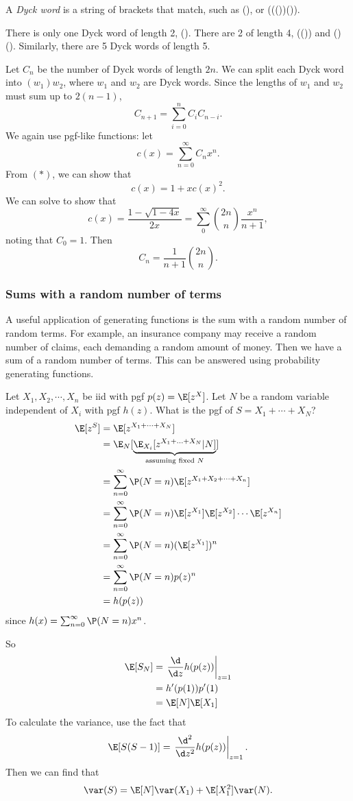 \documentclass[a4paper]{article}
\begin{document}
\begin{eg}
  A \emph{Dyck word} is a string of brackets that match, such as (), or  ((())()).

  There is only one Dyck word of length 2, (). There are 2 of length 4, (()) and ()(). Similarly, there are 5 Dyck words of length 5.

  Let $C_n$ be the number of Dyck words of length $2n$. We can split each Dyck word into $(w_1)w_2$, where $w_1$ and $w_2$ are Dyck words. Since the lengths of $w_1$ and $w_2$ must sum up to $2(n -1)$,
  \[
    C_{n + 1} = \sum_{i = 0}^n C_iC_{n - i}.\tag{*}
  \]
  We again use pgf-like functions: let
  \[
    c(x) = \sum_{n = 0}^\infty C_n x^n.
  \]
  From $(*)$, we can show that
  \[
    c(x) = 1 + xc(x)^2.
  \]
  We can solve to show that
  \[
    c(x) = \frac{1 - \sqrt{1 - 4x}}{2x} = \sum_0^\infty \binom{2n}{n}\frac{x^n}{n + 1},
  \]
  noting that $C_0 = 1$. Then
  \[
    C_n = \frac{1}{n + 1}\binom{2n}{n}.
  \]
\end{eg}

\subsubsection*{Sums with a random number of terms}
A useful application of generating functions is the sum with a random number of random terms. For example, an insurance company may receive a random number of claims, each demanding a random amount of money. Then we have a sum of a random number of terms. This can be answered using probability generating functions.

\begin{eg}
Let $X_1, X_2, \cdots, X_n$ be iid with pgf $p(z) = \E[z^X]$. Let $N$ be a random variable independent of $X_i$ with pgf $h(z)$. What is the pgf of $S = X_1 + \cdots + X_N$?
\begin{align*}
  \E[z^{S}] &= \E[z^{X_1 + \cdots + X_N}]\\
  &= \E_N[\underbrace{\E_{X_i}[z^{X_1 + \ldots + X_N}|N]}_{\text{assuming fixed }N}]\\
  &= \sum_{n = 0}^\infty \P(N = n) \E[z^{X_1 + X_2 + \cdots + X_n}]\\
  &= \sum_{n = 0}^\infty \P(N = n) \E[z^{X_1}] \E[z^{X_2}]\cdots\E[z^{X_n}]\\
  &= \sum_{n = 0}^\infty \P(N = n) (\E[z^{X_1}])^n\\
  &= \sum_{n = 0}^\infty \P(N = n) p(z)^n \\
  &= h(p(z))
\end{align*}
since $h(x) = \sum_{n = 0}^\infty \P(N = n) x^n$.

So
\begin{align*}
  \E[S_N] &= \left.\frac{\d }{\d z}h(p(z))\right|_{z = 1}\\
  &= h'(p(1))p'(1)\\
  &= \E[N]\E[X_1]
\end{align*}
To calculate the variance, use the fact that
\[
  \E[S(S - 1)] = \left.\frac{\d ^2}{\d z^2}h(p(z))\right|_{z = 1}.
\]
Then we can find that
\[
  \var (S) = \E[N]\var(X_1) + \E[X_1^2]\var(N).
\]
\end{eg}
\end{document}

